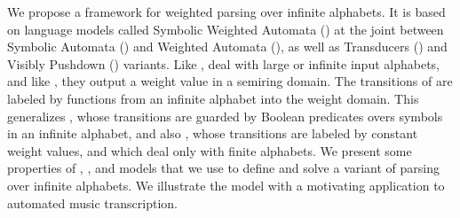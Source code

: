 %
%
We propose a framework for weighted parsing over infinite alphabets.
%
It is based on language models called Symbolic Weighted Automata (\SWA)
at the joint between Symbolic Automata (\SA) and Weighted Automata (\WA),
as well as Transducers (\SWT) and Visibly Pushdown (\SWVPA) variants.
%
Like \SA, \SWA deal with large or infinite input alphabets,
and like \WA, they output a weight value in a semiring domain.
The transitions of \SWA are labeled by functions from an infinite alphabet into the weight domain.
This generalizes \SA, whose transitions are guarded by Boolean predicates
overs symbols in an infinite alphabet,
and also \WA, whose transitions are labeled by constant weight values,
and which deal only with finite alphabets.
%
We present some properties of \SWA, \SWT, and \SWVPA models
that we use to define and solve a variant of parsing
over infinite alphabets.
%
We illustrate the model with a motivating application to
automated music transcription.
